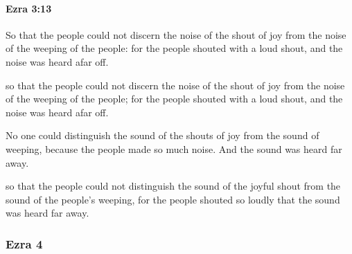 		\paragraph{Ezra 3:13} %
			\label{EZRA-3-13}

			So that the people could not discern the noise of the shout of joy from the noise of the weeping of the people: for the people shouted with a loud shout, and the noise was heard afar off.

			\begin{versebox}
					\item[BHS] 
					\item[LXX] 
					\item[ASV] so that the people could not discern the noise of the shout of joy from the noise of the weeping of the people; for the people shouted with a loud shout, and the noise was heard afar off.
					\item[NIV] No one could distinguish the sound of the shouts of joy from the sound of weeping, because the people made so much noise. And the sound was heard far away.
					\item[NRSV] so that the people could not distinguish the sound of the joyful shout from the sound of the people’s weeping, for the people shouted so loudly that the sound was heard far away.
			\end{versebox}
	\subsubsection{Ezra 4} %
		\label{EZRA-4}

